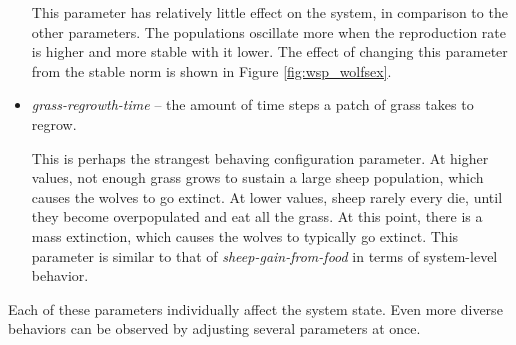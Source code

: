 \begin{itemize}
This parameter has relatively little effect on the system, in comparison to the other parameters.
The populations oscillate more when the reproduction rate is higher and more stable with it lower.
The effect of changing this parameter from the stable norm is  shown in Figure \ref{fig:wsp_wolfsex}.

   \item \textit{grass-regrowth-time} -- the amount of time steps a patch of grass takes to regrow.

This is perhaps the strangest behaving configuration parameter.
At higher values, not enough grass grows to sustain a large sheep population, which causes the wolves to go extinct.
At lower values, sheep rarely every die, until they become overpopulated and eat all the grass.
At this point, there is a mass extinction, which causes the wolves to typically go extinct.
This parameter is similar to that of \textit{sheep-gain-from-food} in terms of system-level behavior.

\end{itemize}
Each of these parameters individually affect the system state.
Even more diverse behaviors can be observed by adjusting several parameters at once.

